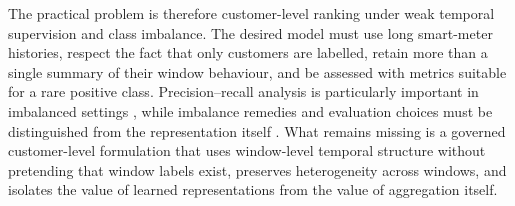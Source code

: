 The practical problem is therefore customer-level ranking under weak temporal supervision and class imbalance. The desired model must use long smart-meter histories, respect the fact that only customers are labelled, retain more than a single summary of their window behaviour, and be assessed with metrics suitable for a rare positive class. Precision--recall analysis is particularly important in imbalanced settings \cite{Saito2015PR}, while imbalance remedies and evaluation choices must be distinguished from the representation itself \cite{He2009Imbalanced}. What remains missing is a governed customer-level formulation that uses window-level temporal structure without pretending that window labels exist, preserves heterogeneity across windows, and isolates the value of learned representations from the value of aggregation itself.
